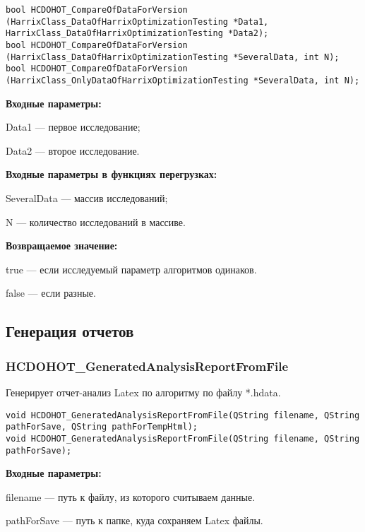 \documentclass[a4paper,12pt]{article}
\begin{document}
\begin{lstlisting}[label=code_syntax_HCDOHOT_CompareOfDataForVersion,caption=Синтаксис]
bool HCDOHOT_CompareOfDataForVersion (HarrixClass_DataOfHarrixOptimizationTesting *Data1, HarrixClass_DataOfHarrixOptimizationTesting *Data2);
bool HCDOHOT_CompareOfDataForVersion (HarrixClass_DataOfHarrixOptimizationTesting *SeveralData, int N);
bool HCDOHOT_CompareOfDataForVersion (HarrixClass_OnlyDataOfHarrixOptimizationTesting *SeveralData, int N);
\end{lstlisting}

\textbf{Входные параметры:}

Data1 --- первое исследование;
 
Data2 --- второе исследование.
	 
\textbf{Входные параметры в функциях перегрузках:}

SeveralData --- массив исследований;
 
N --- количество исследований в массиве.

\textbf{Возвращаемое значение:}

true --- если исследуемый параметр алгоритмов одинаков.
 
false --- если разные.


\subsection{Генерация отчетов}

\subsubsection{HCDOHOT\_GeneratedAnalysisReportFromFile}\label{HCDOHOT_GeneratedAnalysisReportFromFile}

Генерирует отчет-анализ Latex по алгоритму по файлу *.hdata.


\begin{lstlisting}[label=code_syntax_HCDOHOT_GeneratedAnalysisReportFromFile,caption=Синтаксис]
void HCDOHOT_GeneratedAnalysisReportFromFile(QString filename, QString pathForSave, QString pathForTempHtml);
void HCDOHOT_GeneratedAnalysisReportFromFile(QString filename, QString pathForSave);
\end{lstlisting}

\textbf{Входные параметры:}

filename --- путь к файлу, из которого считываем данные.
 
    pathForSave --- путь к папке, куда сохраняем Latex файлы.
 
\end{document}
